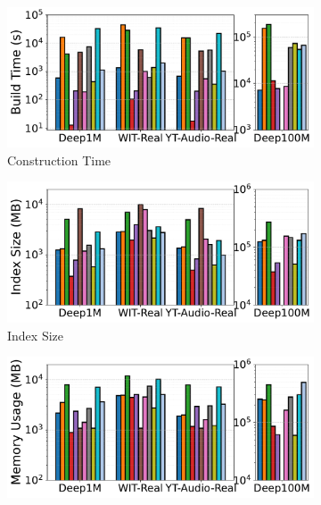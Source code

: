 \documentclass[sigconf, nonacm]{acmart}
\begin{document}
{\begin{figure}[t]
		
		\begin{subfigure}[t]{0.495\columnwidth}
			\centering
			\captionsetup{font=small}
			\includegraphics[width=\linewidth]{figures/indexData/rangeFilter_build_time_comparison_query.pdf}
			\caption{\footnotesize Construction Time}
			\label{fig:rangeFilter_build_time}
		\end{subfigure}
		\hfill
		\begin{subfigure}[t]{0.495\columnwidth}
			\centering
			\includegraphics[width=\linewidth]{figures/indexData/rangeFilter_index_size_mb_comparison_query.pdf}
			\caption{\footnotesize Index Size}
			\label{fig:rangeFilter_index_size_mb}
		\end{subfigure}
		\hfill
		\begin{subfigure}[t]{0.495\columnwidth}
			\centering
			\includegraphics[width=\linewidth]{figures/indexData/rangeFilter_memory_mb_comparison_query.pdf}

\end{subfigure}
\end{figure}}
\end{document}

